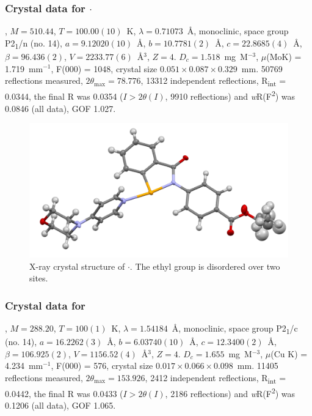 \begin{refsection}
\subsubsection{Crystal data for \texorpdfstring{$ \cdot $}{C25 H25 N3 O4 Se}}
, $M=510.44$, $T=100.00(10)$~K, $ \lambda=0.71073 $~\AA, monoclinic, space group P2\textsubscript{1}/n (no. 14), $a = 9.12020(10)$~\AA, $b = 10.7781(2)$~\AA, $c = 22.8685(4)$~\AA, $\beta = 96.436(2)$\degree, $V = 2233.77(6)$~\AA$^{3}$, $Z = 4$. $D_{c}= 1.518$~mg~M$^{-3}$, $\mu$(MoK\a) = 1.719~mm$^{-1}$, F(000) = 1048, crystal size $0.051 \times 0.087 \times 0.329$~mm. 50769 reflections measured, $2\theta_{\max}=78.776$\degree, 13312 independent reflections, R\textsubscript{int} = 0.0344, the final R was 0.0354 ($I > 2\theta(I)$, 9910 reflections) and \textit{w}R(F\textsuperscript{2}) was 0.0846 (all data), GOF 1.027.

\begin{figure}
  \includegraphics[width=0.6\linewidth]{Figures/ebs-4co2et-morph-xtal.pdf}
  \caption[X-ray crystal structure of \texorpdfstring{$ \cdot $}{C25 H25 N3 O4 Se}.]{X-ray crystal structure of \texorpdfstring{$ \cdot $}{C25 H25 N3 O4 Se}. The ethyl group is disordered over two sites.}
\end{figure}

\subsubsection{Crystal data for \texorpdfstring{}{C14 H11 N O Se}}
, $M=288.20$, $T=100(1)$~K, $\lambda=1.54184$~\AA, monoclinic, space group P2\textsubscript{1}/c (no. 14), $a = 16.2262(3)$~\AA, $b = 6.03740(10)$~\AA, $c = 12.3400(2)$~\AA, $\beta = 106.925(2)$\degree, $V = 1156.52(4)$~\AA$^{3}$, $Z = 4$. $D_{c}= 1.655$~mg~M$^{-3}$, $\mu$(Cu K\a) = 4.234~mm$^{-1}$, F(000) = 576, crystal size $0.017 \times 0.066 \times 0.098$~mm. 11405 reflections measured, $2\theta_{\max}=153.926$\degree, 2412 independent reflections, R\textsubscript{int} = 0.0442, the final R was 0.0433 ($I > 2\theta(I)$, 2186 reflections) and \textit{w}R(F\textsuperscript{2}) was 0.1206 (all data), GOF 1.065.


\end{refsection}
